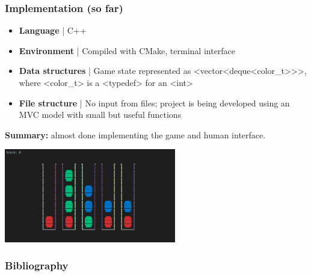 \documentclass{beamer}
\def\texttt#1{<#1>}
\begin{document}
\begin{frame}
\frametitle{Implementation (so far)}

\begin{itemize}
  \item \textbf{Language} | C++
  \item \textbf{Environment} | Compiled with CMake, terminal interface
  \item \textbf{Data structures} | Game state represented as \texttt{vector<deque<color\_t>>}, where \texttt{color\_t} is a \texttt{typedef} for an \texttt{int}
  \item \textbf{File structure} | No input from files; project is being developed using an MVC model with small but useful functions
\end{itemize}

\textbf{Summary:} almost done implementing the game and human interface.

\begin{center}
  \includegraphics[width=75mm]{img/game-interface.png}
\end{center}

\end{frame}

\begin{frame}
  \frametitle{Bibliography}
  
  
  
\end{frame}
\end{document}

